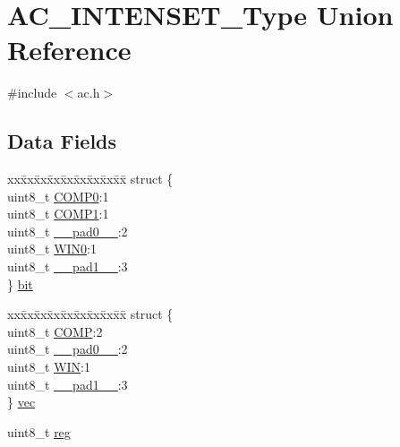 \hypertarget{union_a_c___i_n_t_e_n_s_e_t___type}{}\section{A\+C\+\_\+\+I\+N\+T\+E\+N\+S\+E\+T\+\_\+\+Type Union Reference}
\label{union_a_c___i_n_t_e_n_s_e_t___type}


{\ttfamily \#include $<$ac.\+h$>$}

\subsection*{Data Fields}
\begin{DoxyCompactItemize}
\item 
\begin{tabbing}
xx\=xx\=xx\=xx\=xx\=xx\=xx\=xx\=xx\=\kill
struct \{\\
\>uint8\_t \mbox{\hyperlink{union_a_c___i_n_t_e_n_s_e_t___type_aa1a89fecc6523791fd811ee28d767ef8}{COMP0}}:1\\
\>uint8\_t \mbox{\hyperlink{union_a_c___i_n_t_e_n_s_e_t___type_a4d52eb0bdd0934cfcd0ccd7ec64ae30d}{COMP1}}:1\\
\>uint8\_t \mbox{\hyperlink{union_a_c___i_n_t_e_n_s_e_t___type_a8b4eebe79ded0459acec2f4950102ba3}{\_\_pad0\_\_}}:2\\
\>uint8\_t \mbox{\hyperlink{union_a_c___i_n_t_e_n_s_e_t___type_ab1654ffd18d4bea08938666385d877ef}{WIN0}}:1\\
\>uint8\_t \mbox{\hyperlink{union_a_c___i_n_t_e_n_s_e_t___type_a77f12d2e278bd5c07712648ac0df5e08}{\_\_pad1\_\_}}:3\\
\} \mbox{\hyperlink{union_a_c___i_n_t_e_n_s_e_t___type_a69468dbc7be529208beb843218ed2857}{bit}}\\

\end{tabbing}\item 
\begin{tabbing}
xx\=xx\=xx\=xx\=xx\=xx\=xx\=xx\=xx\=\kill
struct \{\\
\>uint8\_t \mbox{\hyperlink{union_a_c___i_n_t_e_n_s_e_t___type_a31aebd898f59a247ec09db59b349132a}{COMP}}:2\\
\>uint8\_t \mbox{\hyperlink{union_a_c___i_n_t_e_n_s_e_t___type_a8b4eebe79ded0459acec2f4950102ba3}{\_\_pad0\_\_}}:2\\
\>uint8\_t \mbox{\hyperlink{union_a_c___i_n_t_e_n_s_e_t___type_ab094d122e5713969d382227bdeab2946}{WIN}}:1\\
\>uint8\_t \mbox{\hyperlink{union_a_c___i_n_t_e_n_s_e_t___type_a77f12d2e278bd5c07712648ac0df5e08}{\_\_pad1\_\_}}:3\\
\} \mbox{\hyperlink{union_a_c___i_n_t_e_n_s_e_t___type_ae06b0c7f230baad6e1eee290248b066d}{vec}}\\

\end{tabbing}\item 
uint8\+\_\+t \mbox{\hyperlink{union_a_c___i_n_t_e_n_s_e_t___type_a9428adc9af4653a2050e2536b55dec8d}{reg}}
\end{DoxyCompactItemize}


